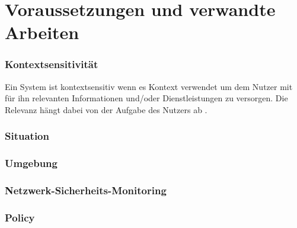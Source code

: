 \chapter{Voraussetzungen und verwandte Arbeiten}
\label{cha:requirements_and_related_work}




\subsection{Kontextsensitivität}

Ein System ist kontextsensitiv wenn es Kontext verwendet um dem Nutzer mit für ihn relevanten Informationen und/oder Dienstleistungen zu versorgen. Die Relevanz hängt dabei von der Aufgabe des Nutzers ab \cite{dey_understanding_2001}.
\subsection{Situation}

\subsection{Umgebung}
\subsection{Netzwerk-Sicherheits-Monitoring}
\subsection{Policy}

